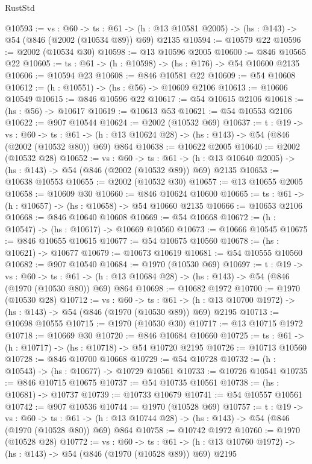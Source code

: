 \begin{lexlean}{RustStd}
\begin{coremodule}
@10593 := {vs : @60} ->
  {ts : @61} -> (h : @13 @10581 @2005) -> (hs : @143) -> @54 (@846 (@2002 (@10534 @89)) @69) @2135
@10594 := @10579 @22
@10596 := @2002 (@10534 @30)
@10598 := @13 @10596 @2005
@10600 := @846 @10565 @22
@10605 := {ts : @61} -> (h : @10598) -> (hs : @176) -> @54 @10600 @2135
@10606 := @10594 @23
@10608 := @846 @10581 @22
@10609 := @54 @10608
@10612 := (h : @10551) -> (hs : @56) -> @10609 @2106
@10613 := @10606 @10549
@10615 := @846 @10596 @22
@10617 := @54 @10615 @2106
@10618 := (hs : @56) -> @10617
@10619 := @10613 @53
@10621 := @54 @10553 @2106
@10622 := @907 @10544
@10624 := @2002 (@10532 @69)
@10637 := {t : @19} ->
  {vs : @60} ->
  {ts : @61} -> (h : @13 @10624 @28) -> (hs : @143) -> @54 (@846 (@2002 (@10532 @80)) @69) @864
@10638 := @10622 @2005
@10640 := @2002 (@10532 @28)
@10652 := {vs : @60} ->
  {ts : @61} -> (h : @13 @10640 @2005) -> (hs : @143) -> @54 (@846 (@2002 (@10532 @89)) @69) @2135
@10653 := @10638 @10553
@10655 := @2002 (@10532 @30)
@10657 := @13 @10655 @2005
@10658 := @10609 @30
@10660 := @846 @10624 @10600
@10665 := {ts : @61} -> (h : @10657) -> (hs : @10658) -> @54 @10660 @2135
@10666 := @10653 @2106
@10668 := @846 @10640 @10608
@10669 := @54 @10668
@10672 := (h : @10547) -> (hs : @10617) -> @10669 @10560
@10673 := @10666 @10545
@10675 := @846 @10655 @10615
@10677 := @54 @10675 @10560
@10678 := (hs : @10621) -> @10677
@10679 := @10673 @10619
@10681 := @54 @10555 @10560
@10682 := @907 @10540
@10684 := @1970 (@10530 @69)
@10697 := {t : @19} ->
  {vs : @60} ->
  {ts : @61} -> (h : @13 @10684 @28) -> (hs : @143) -> @54 (@846 (@1970 (@10530 @80)) @69) @864
@10698 := @10682 @1972
@10700 := @1970 (@10530 @28)
@10712 := {vs : @60} ->
  {ts : @61} -> (h : @13 @10700 @1972) -> (hs : @143) -> @54 (@846 (@1970 (@10530 @89)) @69) @2195
@10713 := @10698 @10555
@10715 := @1970 (@10530 @30)
@10717 := @13 @10715 @1972
@10718 := @10669 @30
@10720 := @846 @10684 @10660
@10725 := {ts : @61} -> (h : @10717) -> (hs : @10718) -> @54 @10720 @2195
@10726 := @10713 @10560
@10728 := @846 @10700 @10668
@10729 := @54 @10728
@10732 := (h : @10543) -> (hs : @10677) -> @10729 @10561
@10733 := @10726 @10541
@10735 := @846 @10715 @10675
@10737 := @54 @10735 @10561
@10738 := (hs : @10681) -> @10737
@10739 := @10733 @10679
@10741 := @54 @10557 @10561
@10742 := @907 @10536
@10744 := @1970 (@10528 @69)
@10757 := {t : @19} ->
  {vs : @60} ->
  {ts : @61} -> (h : @13 @10744 @28) -> (hs : @143) -> @54 (@846 (@1970 (@10528 @80)) @69) @864
@10758 := @10742 @1972
@10760 := @1970 (@10528 @28)
@10772 := {vs : @60} ->
  {ts : @61} -> (h : @13 @10760 @1972) -> (hs : @143) -> @54 (@846 (@1970 (@10528 @89)) @69) @2195

\end{coremodule}
\end{lexlean}
